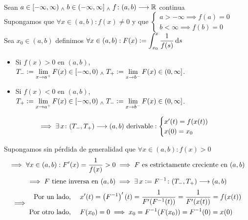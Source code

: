 \begin{teo} \mbox{} \\
	Sean $a\in [-\infty, \infty) \; _{\wedge} \; b\in (-\infty, \infty] \; _{\wedge} \; f \colon (a,b) \longrightarrow \mathbb{R}$ continua \\
	Supongamos que $\forall x \in (a,b) : f(x) \ne 0$ y que $\begin{cases}
			a>-\infty \implies f(a)=0 \\
			b<\infty \implies f(b)=0
		\end{cases}$ \\
	Sea $x_0 \in (a,b)$ definimos $\ds \forall x \in (a,b) : F(x)\defeq\int_{x_0}^{x} \frac{1}{f(s)} \odif{s}$ \\
	\begin{itemize}
		\item Si $f(x)>0$ en $(a,b)$, $\displaystyle T_-\vcentcolon= \lim_{x\to a^+}F(x)\in [-\infty, 0) \; _{\wedge} \; T_+\vcentcolon= \lim_{x\to b^-}F(x) \in (0, \infty]$.
		\item Si $f(x) < 0$ en $(a,b)$, $\displaystyle T_+\vcentcolon= \lim_{x\to a^+}F(x)\in [-\infty, 0) \; _{\wedge} \; T_-\vcentcolon= \lim_{x\to b^-}F(x) \in (0, \infty]$.
	\end{itemize}
	\[\implies \exists \, x \colon (T_-, T_+) \longrightarrow (a,b) \text{ derivable}: \begin{cases}
			x'(t)=f(x(t)) \\
			x(0)=x_0
		\end{cases}\]
	\begin{dem}
		Supongamos sin pérdida de generalidad que $\forall x \in (a,b) : f(x)>0$
		\[\implies \forall x \in (a,b) : F'(x)=\frac{1}{f(x)}>0 \implies F \text{ es estrictamente creciente en }(a,b)\]
		\[\implies F \text{ tiene inversa en } (a, b) \implies \exists\, x\vcentcolon= F^{-1} \colon (T_-,T_+) \longrightarrow (a,b)\]
		\[\implies \begin{aligned}\text{Por un lado, }   & \quad x'(t) = \left(F^{-1}\right)'(t)=\frac{1}{F'(F^{-1}(t))}=\frac{1}{F'(x(t))} = f(x(t)) \\
               \text{Por otro lado, } & \quad F(x_0)=0 \implies x_0= F^{-1}(F(x_0))=F^{-1}(0)=x(0)\end{aligned}\]
	\end{dem}
\end{teo}

